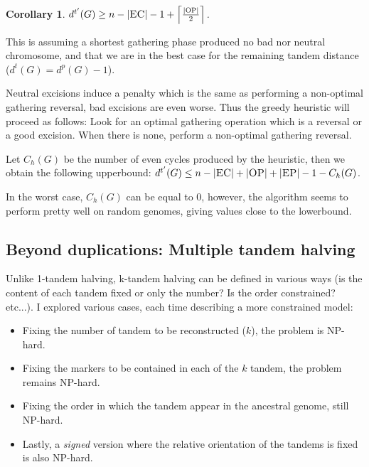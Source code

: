 \documentclass[11pt,final,twoside,nofrench]{thlifl}
\newtheorem{corollary}{Corollary}
\begin{document}
\begin{corollary}
\label{cor:lb}
$d^{t'}(G) \geq n - |{{\textsc{EC}}}| -1 + \left \lceil \frac{\left|{{\textsc{OP}}}\right|}{2} \right \rceil$.
\end{corollary}

This is assuming a shortest gathering phase produced no bad nor neutral chromosome, and that we are in the best case for the remaining tandem distance ($d^t(G) = d^p(G) - 1$).

Neutral excisions induce a penalty which is the same as performing a
non-optimal gathering reversal, bad excisions are even
worse. Thus the greedy heuristic will proceed as follows: Look
for an optimal gathering operation which is a reversal or a good
excision. When there is none, perform a non-optimal gathering
reversal. 

Let $C_h(G)$ be the number of even cycles produced by the heuristic, then we obtain the following upperbound: $d^{t'}(G) \leq n-|{{\textsc{EC}}}|+|{{\textsc{OP}}}|+|{{\textsc{EP}}}|-1 - C_h(G)$.

In the worst case, $C_h(G)$ can be equal to 0, however, the algorithm
seems to perform pretty well on random genomes, giving values close to the lowerbound.

\subsection{Beyond duplications: Multiple tandem halving}
\label{sec:mth}

Unlike 1-tandem halving, k-tandem halving can be defined in various
ways (is the content of each tandem fixed or only the number? Is the order constrained? etc...). I explored various cases, each time describing a more constrained model:

\begin{itemize}
\item Fixing the number of tandem to be reconstructed ($k$), the problem is NP-hard. 

\item Fixing the markers to be contained in each of the $k$ tandem, the problem remains NP-hard.

\item Fixing the order in which the tandem appear in the ancestral genome, still NP-hard. 

\item Lastly, a \emph{signed} version where the relative orientation of the
tandems is fixed is also NP-hard. 
\end{itemize}
\end{document}
